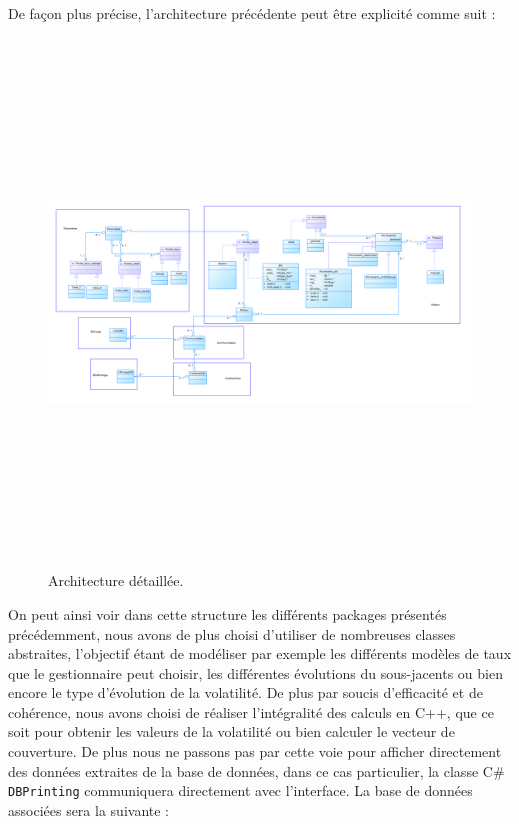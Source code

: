 \documentclass[french,12pt,a4paper]{article}
\begin{document}
De façon plus précise, l'architecture précédente peut être explicité comme suit :

\newpage

\begin{landscape}
\begin{figure}[h!]
  \caption{Architecture détaillée.}
  \centering
    \includegraphics[height=14cm, width = 20cm]{../MAXI_ARCHI2.png}
\end{figure}
\end{landscape}

On peut ainsi voir dans cette structure les différents packages présentés précédemment, nous avons de plus choisi d'utiliser de nombreuses classes abstraites, l'objectif étant de modéliser par exemple les différents modèles de taux que le gestionnaire peut choisir, les différentes évolutions du sous-jacents ou bien encore le type d'évolution de la volatilité. De plus par soucis d'efficacité et de cohérence, nous avons choisi de réaliser l'intégralité des calculs en C++, que ce soit pour obtenir les valeurs de la volatilité ou bien calculer le vecteur de couverture. De plus nous ne passons pas par cette voie pour afficher directement des données extraites de la base de données, dans ce cas particulier, la classe C\# \lstinline!DBPrinting! communiquera directement avec l'interface. La base de données associées sera la suivante :
\end{document}
